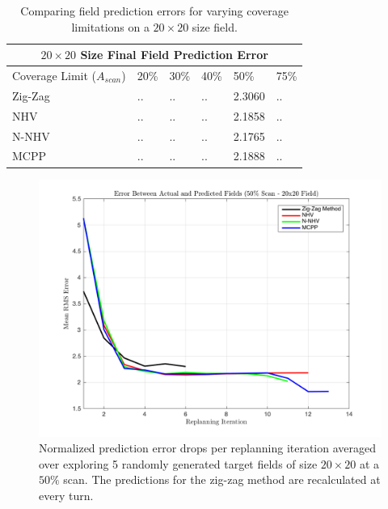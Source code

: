 \begin{table}[ht!]
\centering
	\begin{tabular}{ |p{3cm}||p{1cm}|p{1cm}|p{1cm}|p{1cm}|p{1cm}|  }
		\hline
		\multicolumn{6}{|c|}{$20 \times 20$ Size Final Field Prediction Error} \\
		\hline
		Coverage Limit ($A_{scan}$) & 20\% & 30\% & 40\% & 50\% & 75\% \\
		\hline
		Zig-Zag        & .. & .. & .. & 2.3060 & .. \\
		NHV            & .. & .. & .. & 2.1858 & .. \\
		N-NHV          & .. & .. & .. & 2.1765 & .. \\
		MCPP           & .. & .. & .. & 2.1888 & .. \\
		\hline
	\end{tabular}
	\caption{Comparing field prediction errors for varying coverage limitations on a $20 \times 20$ size field.}
    \label{tab:20fieldprederr}
\end{table}

\begin{figure}[hb!]
	\centering
	\includegraphics[width=0.8\linewidth]{figures/pred_error_20x20_50percent_5runs.png}
    \captionsetup{skip=0.20\baselineskip,size=footnotesize}
	\caption{Normalized prediction error drops per replanning iteration averaged over exploring 5 randomly generated target fields of size $20 \times 20$ at a $50\%$ scan. The predictions for the zig-zag method are recalculated at every turn.}
\end{figure}

